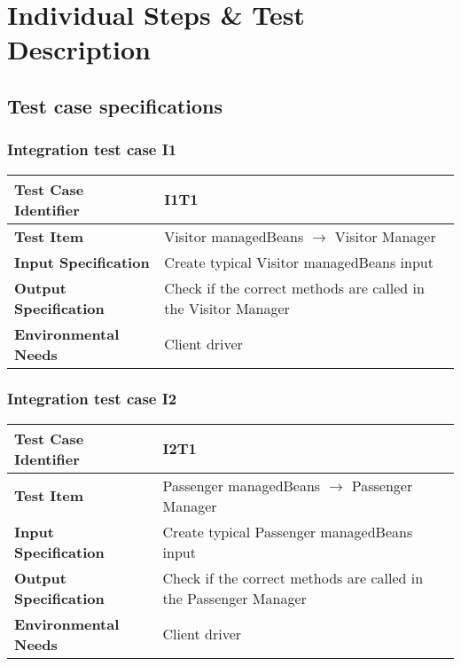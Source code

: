 \chapter{Individual Steps \& Test Description} \label{chap3}

\section{Test case specifications}


\subsection{Integration test case I1}

\begin{table}[!htbp]
\begin{center}
\begin{tabular}[t]{p{}p{}}

\hline
\textbf{Test Case Identifier} & I1T1 \\
\hline
\textbf{Test Item} & Visitor managedBeans $\rightarrow$ Visitor Manager \\
\hline
\textbf{Input Specification} & Create typical Visitor managedBeans input  \\
\hline
\textbf{Output Specification} & Check if the correct methods are called in the Visitor Manager \\
\hline
\textbf{Environmental Needs} & Client driver \\
\hline

\end{tabular}
\end{center}
\end{table}
\clearpage

\subsection{Integration test case I2}

\begin{table}[!htbp]
\begin{center}
\begin{tabular}[t]{p{}p{}}

\hline
\textbf{Test Case Identifier} & I2T1 \\
\hline
\textbf{Test Item} & Passenger managedBeans $\rightarrow$ Passenger Manager \\
\hline
\textbf{Input Specification} & Create typical Passenger managedBeans input  \\
\hline
\textbf{Output Specification} & Check if the correct methods are called in the Passenger Manager \\
\hline
\textbf{Environmental Needs} & Client driver \\
\hline

\end{tabular}
\end{center}
\end{table}

